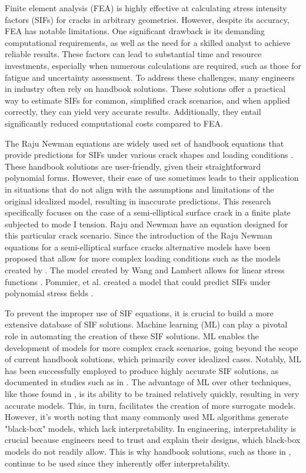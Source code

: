 Finite element analysis (FEA) is highly effective at calculating stress intensity factors (SIFs) for cracks in arbitrary geometries. However, despite its accuracy, FEA has notable limitations. One significant drawback is its demanding computational requirements, as well as the need for a skilled analyst to achieve reliable results. These factors can lead to substantial time and resource investments, especially when numerous calculations are required, such as those for fatigue and uncertainty assessment. To address these challenges, many engineers in industry often rely on handbook solutions. These solutions offer a practical way to estimate SIFs for common, simplified crack scenarios, and when applied correctly, they can yield very accurate results. Additionally, they entail significantly reduced computational costs compared to FEA.


The Raju Newman equations are widely used set of handbook equations that provide predictions for SIFs under various crack shapes and loading conditions \cite{RNeqnsbook}. These handbook solutions are user-friendly, given their straightforward polynomial forms. However, their ease of use sometimes leads to their application in situations that do not align with the assumptions and limitations of the original idealized model, resulting in inaccurate predictions. This research specifically focuses on the case of a semi-elliptical surface crack in a finite plate subjected to mode I tension. Raju and Newman have an equation designed for this particular crack scenario. Since the introduction of the Raju Newman equations for a semi-elliptical surface cracks alternative models have been proposed that allow for more complex loading conditions such as the models created by \cite{Wang1995, Pommier1999}. The model created by Wang and Lambert allows for linear stress functions \cite{Wang1995}. Pommier, et al. created a model that could predict SIFs under polynomial stress fields \cite{Pommier1999}.

 To prevent the improper use of SIF equations, it is crucial to build a more extensive database of SIF solutions. Machine learning (ML) can play a pivotal role in automating the creation of these SIF solutions. ML enables the development of models for more complex crack scenarios, going beyond the scope of current handbook solutions, which primarily cover idealized cases. Notably, ML has been successfully employed to produce highly accurate SIF solutions, as documented in studies such as in \cite{Zhang2023, Sobotka2022, Keprate2017, Xu2022, Seghier2020}. The advantage of ML over other techniques, like those found in \cite{RNeqnsbook, Pommier1999, Wang1995}, is its ability to be trained relatively quickly, resulting in very accurate models. This, in turn, facilitates the creation of more surrogate models. However, it's worth noting that many commonly used ML algorithms generate "black-box" models, which lack interpretability. In engineering, interpretability is crucial because engineers need to trust and explain their designs, which black-box models do not readily allow. This is why handbook solutions, such as those in \cite{RNeqnsbook}, continue to be used since they inherently offer interpretability.


